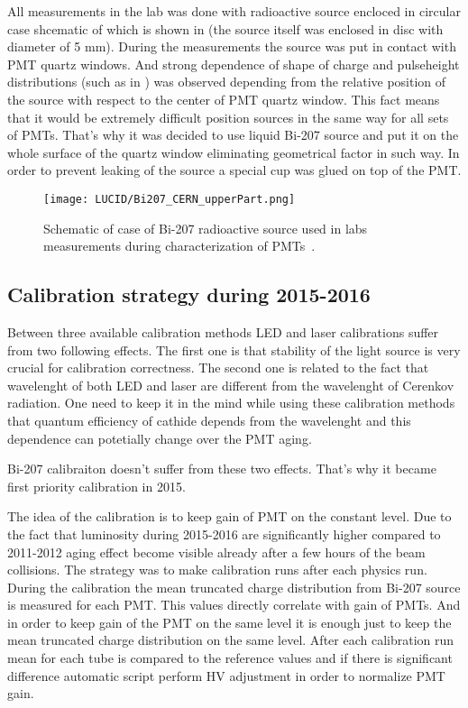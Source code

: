 All measurements in the lab was done with radioactive source encloced in circular case shcematic of which is shown in  
(the source itself was enclosed in disc with diameter of 5 mm).
During the measurements the source was put in contact with PMT quartz windows.
And strong dependence of shape of charge and pulseheight distributions (such as in ) 
was observed depending from the relative position of the source with respect to the center of PMT quartz window.
This fact means that it would be extremely difficult position sources in the same way for all sets of PMTs.
That's why it was decided to use liquid Bi-207 source and put it on the whole surface of the quartz window eliminating geometrical factor in such way.
In order to prevent leaking of the source a special cup was glued on top of the PMT.
 
\begin{figure}
\centering
\texttt{[image: LUCID/Bi207\_CERN\_upperPart.png]}
\caption{Schematic of case of Bi-207 radioactive source used in labs measurements during characterization of PMTs~\cite{Alberghi:2016tad}.}
\label{fig:Bi207_case}
\end{figure}





\subsection{Calibration strategy during 2015-2016}
\label{subsec:calibPerformance}

Between three available calibration methods LED and laser calibrations suffer from two following effects.
The first one is that stability of the light source is very crucial for calibration correctness.
The second one is related to the fact that wavelenght of both LED and laser are different from the 
wavelenght of Cerenkov radiation. 
One need to keep it in the mind while using these calibration methods that quantum efficiency of cathide depends from the wavelenght 
and this dependence can potetially change over the PMT aging.


Bi-207 calibraiton doesn't suffer from these two effects. That's why it became first priority calibration in 2015.


The idea of the calibration is to keep gain of PMT on the constant level.
Due to the fact that luminosity during 2015-2016 are significantly higher compared to 2011-2012
aging effect become visible already after a few hours of the beam collisions.
The strategy was to make calibration runs after each physics run.
During the calibration the mean truncated charge distribution from Bi-207 source is measured for each PMT.
This values directly correlate with gain of PMTs. 
And in order to keep gain of the PMT on the same level it is enough just to keep the mean truncated charge distribution on the same level.
After each calibration run mean for each tube is compared to the reference values and if there is significant difference automatic script perform HV adjustment 
in order to normalize PMT gain.

